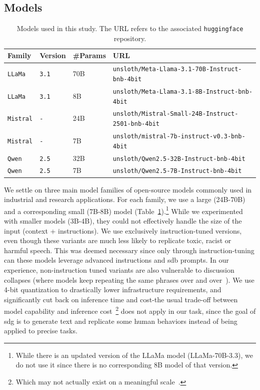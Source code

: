 \subsection{Models}
\label{sec:appendix:replication:models}

\begin{table}[ht]
	\centering
	\caption{Models used in this study. The URL refers to the associated \texttt{huggingface} repository.}
	\label{tab:model-details}
	\begin{tabular}{l l l l}
		\toprule
		\textbf{Family} & \textbf{Version} & \textbf{\#Params} & \textbf{URL} \\
		\midrule
		\texttt{LLaMa} & \texttt{3.1} & 70B & \texttt{unsloth/Meta-Llama-3.1-70B-Instruct-bnb-4bit} \\
		\texttt{LLaMa} & \texttt{3.1} & 8B & \texttt{unsloth/Meta-Llama-3.1-8B-Instruct-bnb-4bit} \\
		\texttt{Mistral} & \texttt{-} & 24B & \texttt{unsloth/Mistral-Small-24B-Instruct-2501-bnb-4bit} \\
		\texttt{Mistral} & \texttt{-} & 7B & \texttt{unsloth/mistral-7b-instruct-v0.3-bnb-4bit} \\
		\texttt{Qwen} & \texttt{2.5} & 32B & \texttt{unsloth/Qwen2.5-32B-Instruct-bnb-4bit} \\
		\texttt{Qwen} & \texttt{2.5} & 7B & \texttt{unsloth/Qwen2.5-7B-Instruct-bnb-4bit} \\
		\bottomrule
	\end{tabular}
\end{table}

We settle on three main model families of open-source models commonly used in industrial and research applications. For each family, we use a large (24B-70B) and a corresponding small (7B-8B) model (Table~\ref{tab:model-details}).\footnote{While there is an updated version of the LLaMa model (LLaMa-70B-3.3), we do not use it since there is no corresponding 8B model of that version.} While we experimented with smaller models (3B-4B), they could not effectively handle the size of the input (context + instructions). We use exclusively instruction-tuned versions, even though these variants are much less likely to replicate toxic, racist or harmful speech. This was deemed necessary since only through instruction-tuning can these models leverage advanced instructions and \ac{sdb} prompts. In our experience, non-instruction tuned variants are also vulnerable to discussion collapses (where models keep repeating the same phrases over and over~\cite{ulmer2024}). We use 4-bit quantization to drastically lower infrastructure requirements, and significantly cut back on inference time and cost-the usual trade-off between model capability and inference cost~\cite{Huang2024}\footnote{Which may not actually exist on a meaningful scale~\cite{kurtic-etal-2025-give}.} does not apply in our task, since the goal of \ac{sdg} is to generate text and replicate some human behaviors instead of being applied to precise tasks.


